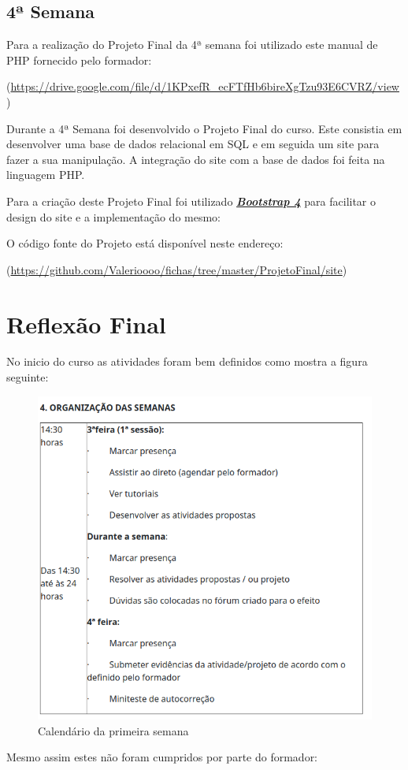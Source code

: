 \documentclass[14pt]{article}
\begin{document}
\subsection{4ª Semana}

Para a realização do Projeto Final da 4ª semana foi utilizado este manual de PHP fornecido pelo formador:

(\url{https://drive.google.com/file/d/1KPxefR_ecFTfHb6bireXgTzu93E6CVRZ/view})

Durante a 4ª Semana foi desenvolvido o Projeto Final do curso.
Este consistia em desenvolver uma base de dados relacional em SQL e em seguida um site para fazer a sua manipulação.
A integração do site com a base de dados foi feita na linguagem PHP.

Para a criação deste Projeto Final foi utilizado \href{https://getbootstrap.com/}{\textbf{\textit{Bootstrap 4}}} para facilitar o design do site e a implementação do mesmo:


O código fonte do Projeto está disponível neste endereço:

(\url{https://github.com/Valerioooo/fichas/tree/master/ProjetoFinal/site})


\newpage
\section{Reflexão Final}

No inicio do curso as atividades foram bem definidos como mostra a figura seguinte:

\begin{figure}[H]
    \centering
    \includegraphics[width=0.45\linewidth]{cal.png}
    \caption{Calendário da primeira semana}
    \label{fig:cal}
\end{figure}


Mesmo assim estes não foram cumpridos por parte do formador:
\end{document}
